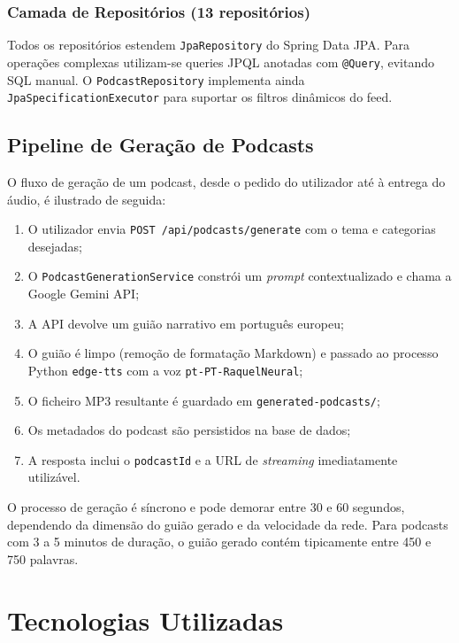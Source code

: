 \documentclass[12pt, a4paper]{report}
\begin{document}
\subsection{Camada de Repositórios (13 repositórios)}

Todos os repositórios estendem \texttt{JpaRepository} do Spring Data JPA.
Para operações complexas utilizam-se queries JPQL anotadas com \texttt{@Query},
evitando SQL manual. O \texttt{PodcastRepository} implementa ainda
\texttt{JpaSpecificationExecutor} para suportar os filtros dinâmicos do feed.

\section{Pipeline de Geração de Podcasts}

O fluxo de geração de um podcast, desde o pedido do utilizador até à entrega
do áudio, é ilustrado de seguida:

\begin{enumerate}
  \item O utilizador envia \texttt{POST /api/podcasts/generate} com o tema e categorias desejadas;
  \item O \texttt{PodcastGenerationService} constrói um \emph{prompt} contextualizado e chama a Google Gemini API;
  \item A API devolve um guião narrativo em português europeu;
  \item O guião é limpo (remoção de formatação Markdown) e passado ao processo Python \texttt{edge-tts} com a voz \texttt{pt-PT-RaquelNeural};
  \item O ficheiro MP3 resultante é guardado em \texttt{generated-podcasts/};
  \item Os metadados do podcast são persistidos na base de dados;
  \item A resposta inclui o \texttt{podcastId} e a URL de \emph{streaming} imediatamente utilizável.
\end{enumerate}

\begin{destaque}[title=Nota sobre desempenho]
  O processo de geração é síncrono e pode demorar entre 30 e 60 segundos, dependendo
  da dimensão do guião gerado e da velocidade da rede. Para podcasts com 3 a 5 minutos
  de duração, o guião gerado contém tipicamente entre 450 e 750 palavras.
\end{destaque}

\chapter{Tecnologias Utilizadas}
\label{chap:tecnologias}
\end{document}
